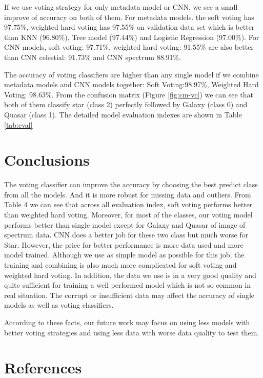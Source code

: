 \documentclass[
  11pt,
]{article}
\begin{document}
If we use voting strategy for only metadata model or CNN, we see a small improve of accuracy on both of them. For metadata models. the soft voting has 97.75\%, weighted hard voting has 97.55\% on validation data set which is better than KNN (96.80\%), Tree model (97.44\%) and Logistic Regression (97.00\%). For CNN models, soft voting: 97.71\%, weighted hard voting: 91.55\% are also better than CNN celestial: 91.73\% and CNN spectrum 88.91\%.

The accuracy of voting classifiers are higher than any single model if we combine metadata models and CNN models together: Soft Voting:98.97\%, Weighted Hard Voting: 98.63\%. From the confusion matrix (Figure \ref{fig:cm-vc}) we can see that both of them classify star (class 2) perfectly followed by Galaxy (class 0) and Quasar (class 1). The detailed model evaluation indexes are shown in Table \ref{tab:eval}

\hypertarget{conclusions}{%
\section{Conclusions}\label{conclusions}}

The voting classifier can improve the accuracy by choosing the best predict class from all the models. And it is more robust for missing data and outliers. From Table 4 we can see that across all evaluation index, soft voting performs better than weighted hard voting. Moreover, for most of the classes, our voting model performs better than single model except for Galaxy and Quasar of image of spectrum data. CNN does a better job for these two class but much worse for Star.
However, the price for better performance is more data used and more model trained. Although we use as simple model as possible for this job, the training and combining is also much more complicated for soft voting and weighted hard voting. In addition, the data we use is in a very good quality and quite sufficient for training a well performed model which is not so common in real situation. The corrupt or insufficient data may affect the accuracy of single models as well as voting classifiers.

According to these facts, our future work may focus on using less models with better voting strategies and using less data with worse data quality to test them.

\newpage

\hypertarget{references}{%
\section{References}\label{references}}
\end{document}
